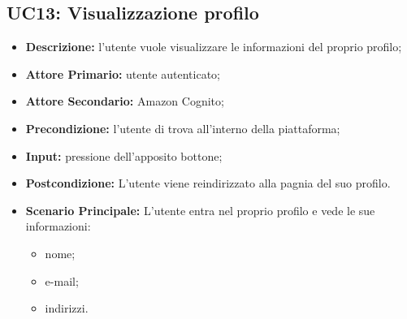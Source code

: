 \subsection{UC13: Visualizzazione profilo}
\label{sec:UC13}
\begin{itemize}
    \item \textbf{Descrizione:} l'utente vuole visualizzare le informazioni del proprio profilo;
    \item \textbf{Attore Primario:} utente autenticato;
    \item \textbf{Attore Secondario:} Amazon Cognito;
    \item \textbf{Precondizione:} l'utente di trova all'interno della piattaforma;
    \item \textbf{Input:} pressione dell'apposito bottone;
    \item \textbf{Postcondizione:} L'utente viene reindirizzato alla pagnia del suo profilo.
    \item \textbf{Scenario Principale:} L'utente entra nel proprio profilo e vede le sue informazioni:
    \begin{itemize}
        \item nome;
        \item e-mail;
        \item indirizzi.
    \end{itemize}
\end{itemize}